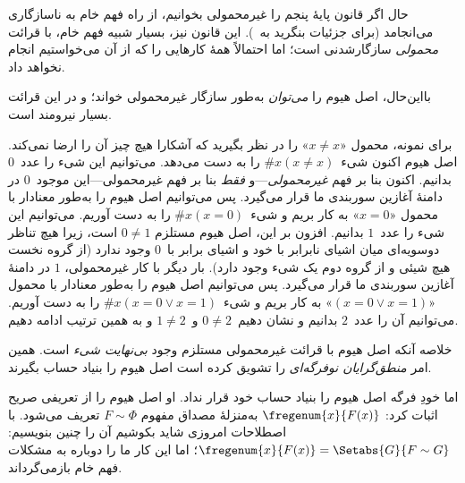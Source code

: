 \documentclass[../../../include/open-logic-section]{subfiles}
\begin{document}
حال اگر قانون پایهٔ پنجم را غیرمحمولی بخوانیم، از راه فهم خام به
ناسازگاری می‌انجامد (برای جزئیات بنگرید به~).
این قانون نیز، بسیار شبیه فهم خام، با قرائت \emph{محمولی} سازگارشدنی
است؛ اما احتمالاً همهٔ کارهایی را که از آن می‌خواستیم انجام نخواهد داد.

بااین‌حال، اصل هیوم را \emph{می‌توان} به‌طور سازگار غیرمحمولی خواند؛ و
در این قرائت بسیار نیرومند است.

برای نمونه، محمول «$x\neq x$» را در نظر بگیرید که آشکارا هیچ چیز آن را
ارضا نمی‌کند. اصل هیوم اکنون شیء~$\# x(x\neq x)$ را به دست می‌دهد.
می‌توانیم این شیء را عدد~$0$ بدانیم. اکنون بنا بر فهم
\emph{غیرمحمولی}---و \emph{فقط} بنا بر فهم غیرمحمولی---این موجود~$0$ در
دامنهٔ آغازین سوربندی ما قرار می‌گیرد. پس می‌توانیم اصل هیوم را به‌طور
معنادار با محمول «$x=0$» به کار بریم و شیء~$\#x(x=0)$ را به دست آوریم.
می‌توانیم این شیء را عدد~$1$ بدانیم. افزون بر این، اصل هیوم مستلزم
$0\neq1$ است، زیرا هیچ تناظر دوسویه‌ای میان اشیای نابرابر با خود و اشیای
برابر با~$0$ وجود ندارد (از گروه نخست هیچ شیئی و از گروه دوم یک شیء وجود
دارد). بار دیگر با کار غیرمحمولی، $1$ در دامنهٔ آغازین سوربندی ما قرار
می‌گیرد. پس می‌توانیم اصل هیوم را به‌طور معنادار با محمول
«$(x=0\lor x=1)$» به کار بریم و شیء~$\#x(x=0\lor x=1)$ را به دست
آوریم. می‌توانیم آن را عدد~$2$ بدانیم و نشان دهیم~$0\neq2$ و~$1\neq2$
و به همین ترتیب ادامه دهیم.

خلاصه آنکه اصل هیوم با قرائت غیرمحمولی مستلزم وجود \emph{بی‌نهایت شیء}
است. همین امر \emph{منطق‌گرایان نوفرگه‌ای} را تشویق کرده است اصل هیوم
را بنیاد حساب بگیرند.

اما خودِ فرگه اصل هیوم را بنیاد حساب خود قرار نداد. او اصل هیوم را از
تعریفی صریح اثبات کرد: $\fregenum{x}{F(x)}$ به‌منزلهٔ مصداق مفهوم
$F\sim\Phi$ تعریف می‌شود. با اصطلاحات امروزی شاید بکوشیم آن را چنین
بنویسیم: $\fregenum{x}{F(x)}=\Setabs{G}{F\sim G}$؛ اما این کار ما را
دوباره به مشکلات فهم خام بازمی‌گرداند.
\end{document}
